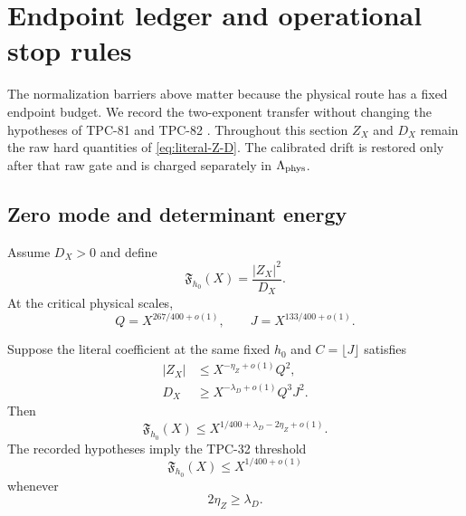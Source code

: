 \section{Endpoint ledger and operational stop rules}
\label{sec:endpoint-ledger}

The normalization barriers above matter because the physical route
has a fixed endpoint budget.  We record the two-exponent transfer
without changing the hypotheses of TPC-81 and TPC-82
\citep{WangTPC81,WangTPC82}.
Throughout this section \(Z_X\) and \(D_X\) remain the raw hard
quantities of \eqref{eq:literal-Z-D}.  The calibrated drift is restored
only after that raw gate and is charged separately in
\(\Lambda_{\rm phys}\).

\subsection{Zero mode and determinant energy}

Assume \(D_X>0\) and define
\begin{equation}
 \mathfrak F_{h_0}(X)
 =\frac{|Z_X|^2}{D_X}.
 \label{eq:endpoint-flatness}
\end{equation}
At the critical physical scales,
\begin{equation}
 Q=X^{267/400+o(1)},
 \qquad
 J=X^{133/400+o(1)}.
 \label{eq:endpoint-critical-scales}
\end{equation}

\begin{proposition}
\label{prop:endpoint-two-exponent}
Suppose the literal coefficient at the same fixed \(h_0\) and
\(C=\lfloor J\rfloor\) satisfies
\begin{align}
 |Z_X|
 &\le X^{-\eta_Z+o(1)}Q^2,
 \label{eq:endpoint-Z-hypothesis}\\
 D_X
 &\ge X^{-\lambda_D+o(1)}Q^3J^2.
 \label{eq:endpoint-D-hypothesis}
\end{align}
Then
\begin{equation}
 \boxed{
 \mathfrak F_{h_0}(X)
 \le
 X^{1/400+\lambda_D-2\eta_Z+o(1)}.}
 \label{eq:endpoint-two-exponent-bound}
\end{equation}
The recorded hypotheses imply the TPC-32 threshold
\begin{equation}
 \mathfrak F_{h_0}(X)\le X^{1/400+o(1)}
 \label{eq:endpoint-tpc32-threshold}
\end{equation}
whenever
\begin{equation}
 2\eta_Z\ge\lambda_D.
 \label{eq:endpoint-compatibility}
\end{equation}
\end{proposition}

